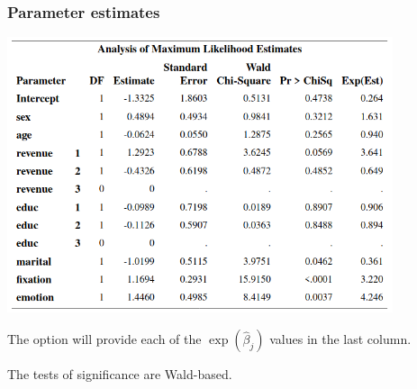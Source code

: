 \documentclass{beamer}
\begin{document}
\begin{frame}
\frametitle{Parameter estimates}
\begin{center}
\includegraphics[width = 0.85\textwidth]{img/c4/slides8-e13}
\end{center}
{\footnotesize 

\bi
\item The option  will provide each of the $\exp(\hat{\beta}_j)$ values in the last column.
\item The tests of significance are Wald-based.
\ei
}
\end{frame}
\end{document}
